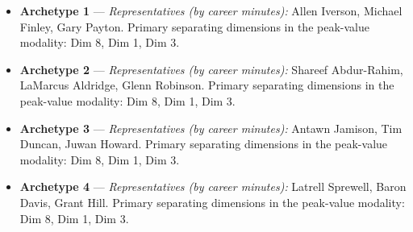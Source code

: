 \begin{itemize}
\item \textbf{Archetype 1} --- \emph{Representatives (by career minutes):} Allen Iverson, Michael Finley, Gary Payton. Primary separating dimensions in the peak-value modality: Dim 8, Dim 1, Dim 3.
\item \textbf{Archetype 2} --- \emph{Representatives (by career minutes):} Shareef Abdur-Rahim, LaMarcus Aldridge, Glenn Robinson. Primary separating dimensions in the peak-value modality: Dim 8, Dim 1, Dim 3.
\item \textbf{Archetype 3} --- \emph{Representatives (by career minutes):} Antawn Jamison, Tim Duncan, Juwan Howard. Primary separating dimensions in the peak-value modality: Dim 8, Dim 1, Dim 3.
\item \textbf{Archetype 4} --- \emph{Representatives (by career minutes):} Latrell Sprewell, Baron Davis, Grant Hill. Primary separating dimensions in the peak-value modality: Dim 8, Dim 1, Dim 3.
\end{itemize}
